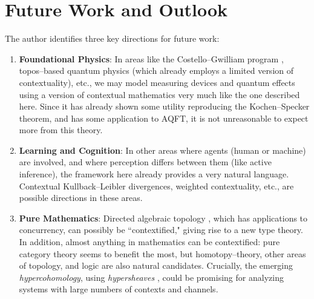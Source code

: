 \documentclass{article}
\numberwithin{tm}{section}
\numberwithin{dn}{section}
\numberwithin{as}{section}
\numberwithin{rk}{section}
\numberwithin{lem}{section}
\numberwithin{ax}{section}
\numberwithin{pp}{section}
\numberwithin{eg}{section}
\numberwithin{war}{section}
\numberwithin{equation}{section}
\numberwithin{prop}{section}
\numberwithin{nt}{section}
\numberwithin{rc}{section}
\begin{document}
\section{Future Work and Outlook}
The author identifies three key directions for future work:
\begin{enumerate}
	\item \textbf{Foundational Physics}: In areas like the Costello--Gwilliam program \cite{costello}, topos--based quantum physics (which already employs a limited version of contextuality), etc., we may model measuring devices and quantum effects using a version of contextual mathematics very much like the one described here. Since it has already shown some utility reproducing the Kochen--Specker theorem, and has some application to AQFT, it is not unreasonable to expect more from this theory. 
	\item \textbf{Learning and Cognition}: In other areas where agents (human or machine) are involved, and where perception differs between them (like active inference), the framework here already provides a very natural language. Contextual Kullback--Leibler divergences, weighted contextuality, etc., are possible directions in these areas.
	\item \textbf{Pure Mathematics}: Directed algebraic topology \cite{grandis, gaucher}, which has applications to concurrency, can possibly be ``contextified," giving rise to a new type theory. In addition, almost anything in mathematics can be contextified: pure category theory seems to benefit the most, but homotopy--theory, other areas of topology, and logic are also natural candidates. Crucially, the emerging \emph{hypercohomology}, using \emph{hypersheaves} \cite{clausen}, could be promising for analyzing systems with large numbers of contexts and channels. 
\end{enumerate}
\end{document}
